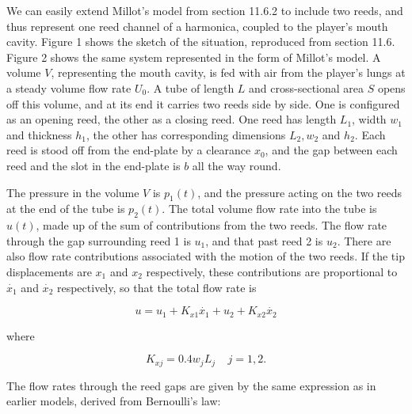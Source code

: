   We can easily extend Millot's model from section 11.6.2 to include two reeds, 
  and thus represent one reed channel of a harmonica, coupled to the player's 
  mouth cavity. Figure 1 shows the sketch of the situation, reproduced from 
  section 11.6. Figure 2 shows the same system represented in the form of 
  Millot's model. A volume $V$, representing the mouth cavity, is fed with air 
  from the player's lungs at a steady volume flow rate $U_0$. A tube of length 
  $L$ and cross-sectional area $S$ opens off this volume, and at its end it 
  carries two reeds side by side. One is configured as an opening reed, the 
  other as a closing reed. One reed has length $L_1$, width $w_1$ and thickness 
  $h_1$, the other has corresponding dimensions $L_2, w_2$ and $h_2$. Each reed 
  is stood off from the end-plate by a clearance $x_0$, and the gap between 
  each reed and the slot in the end-plate is $b$ all the way round. 



  The pressure in the volume $V$ is $p_1(t)$, and the pressure acting on the 
  two reeds at the end of the tube is $p_2(t)$. The total volume flow rate into 
  the tube is $u(t)$, made up of the sum of contributions from the two reeds. 
  The flow rate through the gap surrounding reed 1 is $u_1$, and that past reed 
  2 is $u_2$. There are also flow rate contributions associated with the motion 
  of the two reeds. If the tip displacements are $x_1$ and $x_2$ respectively, 
  these contributions are proportional to $\dot{x_1}$ and $\dot{x_2}$ 
  respectively, so that the total flow rate is 

  $$u=u_1+K_{x1} \dot{x_1} + u_2 +K_{x2} \dot{x_2} \tag{1}$$ 

  where 

  $$K_{xj}=0.4 w_j L_j \mathrm{~~~~~} j=1,2. \tag{2}$$ 

  The flow rates through the reed gaps are given by the same expression as in 
  earlier models, derived from Bernoulli's law: 

